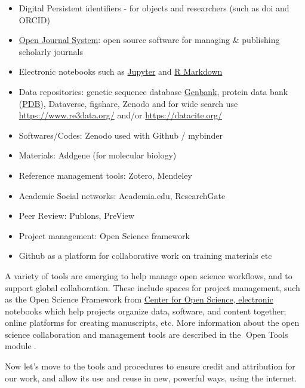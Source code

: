 \documentclass[
  letterpaper,
  DIV=11,
  numbers=noendperiod]{scrreport}
\providecommand{\tightlist}{%
  \setlength{\itemsep}{0pt}\setlength{\parskip}{0pt}}\usepackage{longtable,booktabs,array}
\begin{document}
\begin{itemize}
\tightlist
\item
  Digital Persistent identifiers - for objects and researchers (such as
  doi and ORCID)\\
\item
  \href{https://pkp.sfu.ca/ojs/}{Open Journal System}: open source
  software for managing \& publishing scholarly journals\\
\item
  Electronic notebooks such as \href{https://jupyter.org/}{Jupyter} and
  \href{https://rmarkdown.rstudio.com/}{R Markdown}\\
\item
  Data repositories: genetic sequence database
  \href{https://www.ncbi.nlm.nih.gov/genbank/}{Genbank}, protein data
  bank (\href{https://www.rcsb.org/}{PDB}), Dataverse, figshare, Zenodo
  and for wide search use \url{https://www.re3data.org/} and/or
  \url{https://datacite.org/}\\
\item
  Softwares/Codes: Zenodo used with Github / mybinder\\
\item
  Materials: Addgene (for molecular biology)\\
\item
  Reference management tools: Zotero, Mendeley\\
\item
  Academic Social networks: Academia.edu, ResearchGate\\
\item
  Peer Review: Publons, PreView\\
\item
  Project management: Open Science framework
\item
  Github as a platform for collaborative work on training materials etc
\end{itemize}

A variety of tools are emerging to help manage open science workflows,
and to support global collaboration. These include spaces for project
management, such as the Open Science Framework from
\href{https://www.cos.io/}{Center for Open Science, electronic}
notebooks which help projects organize data, software, and content
together; online platforms for creating manuscripts, etc. More
information about the open science collaboration and management tools
are described in the 🔗Open Tools module🔗.

Now let's move to the tools and procedures to ensure credit and
attribution for our work, and allow its use and reuse in new, powerful
ways, using the internet.
\end{document}
